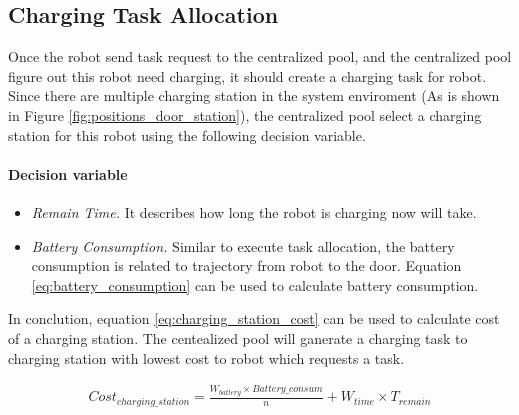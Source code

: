 \subsection{Charging Task Allocation}
Once the robot send task request to the centralized pool, and the centralized pool figure out this robot need charging, it should create a charging task for robot. Since there are multiple charging station in the system enviroment (As is shown in Figure \ref{fig:positions_door_station}), the centralized pool select a charging station for this robot using the following decision variable.

\paragraph*{Decision variable}

\begin{itemize}
	\item \textsl{Remain Time.} It describes how long the robot is charging now will take. 
	\item \textsl{Battery Consumption.} Similar to execute task allocation, the battery consumption is related to trajectory from robot to the door. Equation \ref{eq:battery_consumption} can be used to calculate battery consumption.
\end{itemize}
In conclution, equation \ref{eq:charging_station_cost} can be used to calculate cost of a charging station. The centealized pool will ganerate a charging task to charging station with lowest cost to robot which requests a task.

\begin{equation}
	\label{eq:charging_station_cost}
	\begin{split}
	Cost_{charging\_station} = \frac{W_{battery} \times Battery\_consum}{n} + W_{time} \times T_{remain}
	\end{split}
\end{equation}



